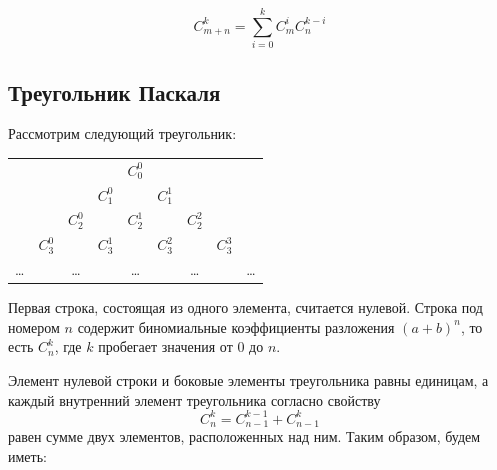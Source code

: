 \begin{property}
    \[
        C_{m + n}^k = \sum_{i = 0}^k C_m^i C_n^{k - i}
    \]
\end{property}

\subsection{Треугольник Паскаля}

Рассмотрим следующий треугольник:

{
\renewcommand*{\arraystretch}{1.5}
\begin{longtable}{ccccccccc}
           &           &           &           & \(C_0^0\) &           &           &           &        \\
           &           &           & \(C_1^0\) &           & \(C_1^1\) &           &           &        \\
           &           & \(C_2^0\) &           & \(C_2^1\) &           & \(C_2^2\) &           &        \\
           & \(C_3^0\) &           & \(C_3^1\) &           & \(C_3^2\) &           & \(C_3^3\) &        \\
    \ldots &           & \ldots    &           & \ldots    &           & \ldots    &           & \ldots \\
\end{longtable}
}

Первая строка, состоящая из одного элемента, считается нулевой. Строка под номером \(n\) содержит биномиальные коэффициенты разложения \((a + b)^n\), то есть \(C_n^k\), где \(k\) пробегает значения от \(0\) до \(n\).

Элемент нулевой строки и боковые элементы треугольника равны единицам, а каждый внутренний элемент треугольника согласно свойству
\[
    C_n^k = C_{n - 1}^{k - 1} + C_{n - 1}^k
\]
равен сумме двух элементов, расположенных над ним. Таким образом, будем иметь:

